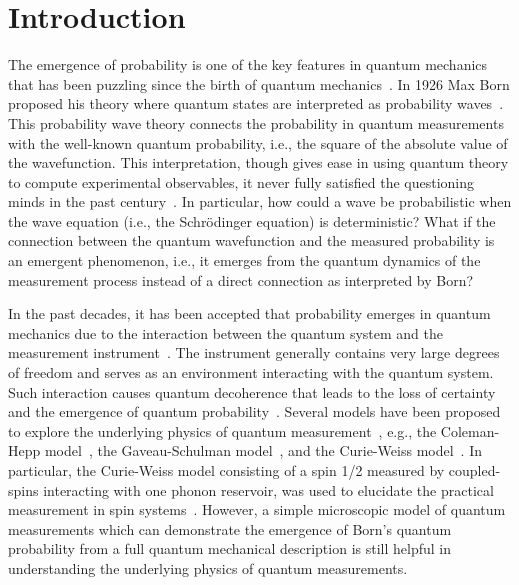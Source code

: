 \documentclass[twocolumn,showpacs,preprintnumbers,amsmath,amssymb]{revtex4}
\begin{document}
	
	
	\section{Introduction}
The emergence of probability is one of the key features in quantum mechanics that has been puzzling since the birth of quantum mechanics~\cite{sw1989ap,sw1989prl}. In 1926 Max Born proposed his theory where quantum states are interpreted as probability waves~\cite{mborn1926zp,mborn1954nl}. This probability wave theory connects the probability in quantum measurements with the well-known quantum probability, i.e., the square of the absolute value of the wavefunction. This interpretation, though gives ease in using quantum theory to compute experimental observables, it never fully satisfied the questioning minds in the past century~\cite{usinha2010science,abassi2013rmp,pshadbolt2014np,mop2021prl}. In particular, how could a wave be probabilistic when the wave equation (i.e., the Schr\"odinger equation) is deterministic? What if the connection between the quantum wavefunction and the measured probability is an emergent phenomenon, i.e., it emerges from the quantum dynamics of the measurement process instead of a direct connection as interpreted by Born?

In the past decades, it has been accepted that probability emerges in quantum mechanics due to the interaction between the quantum system and the measurement instrument~\cite{jaw1984book,hmwiseman2011book}. The instrument generally contains very large degrees of freedom and serves as an environment interacting with the quantum system. Such interaction causes quantum decoherence that leads to the loss of certainty and the emergence of quantum probability~\cite{whz2003prl,whz2005pra,ms2005fop,um2004ijqi}. Several models have been proposed to explore the underlying physics of quantum measurement~\cite{aea2013rmp}, e.g., the Coleman-Hepp model~\cite{bs2001book}, the Gaveau-Schulman model~\cite{gb1990jsp}, and the Curie-Weiss model~\cite{aea2003epl}. In particular, the Curie-Weiss model consisting of a spin 1/2 measured by coupled-spins interacting with one phonon reservoir, was used to elucidate the practical measurement in spin systems~\cite{aea2013rmp}. However, a simple microscopic model of quantum measurements which can demonstrate the emergence of Born's quantum probability from a full quantum mechanical description is still helpful in understanding the underlying physics of quantum measurements.
\end{document}
